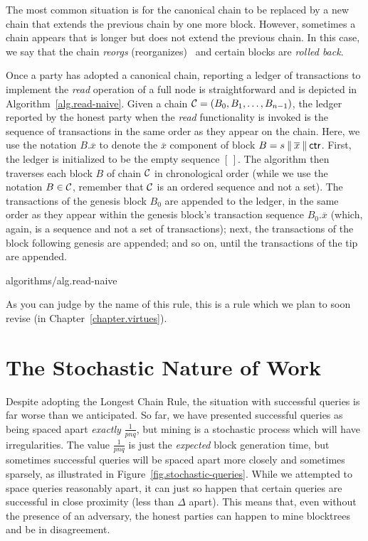 The most common situation is for the canonical chain to be replaced by a new chain
that extends the previous chain by one more block. However, sometimes a chain appears
that is longer but does not extend the previous chain. In this case, we say that
the chain \emph{reorgs} (reorganizes)~ and certain blocks are \emph{rolled
back}.

Once a party has adopted a canonical chain, reporting a ledger of transactions
to implement the \emph{read} operation of a full node is straightforward and
is depicted in Algorithm~\ref{alg.read-naive}. Given a chain
$\mathcal{C} = (B_0, B_1, \ldots, B_{n-1})$, the ledger reported by the honest
party when the \emph{read} functionality is invoked is the sequence of
transactions in the same order as they appear on the chain.
Here, we use the notation $B.\overline{x}$ to denote the $\overline{x}$ component
of block $B = s \mathbin{\|} \overline{x} \mathbin{\|} \mathsf{ctr}$.
First, the ledger is initialized to be the empty sequence $[\,]$. The algorithm
then traverses each block $B$ of chain $\mathcal{C}$ in chronological order (while we
use the notation $B \in \mathcal{C}$, remember that $\mathcal{C}$ is an ordered sequence
and not a set). The transactions of the genesis block $B_0$ are appended to the ledger, in the same
order as they appear within the genesis block's transaction sequence $B_0.\overline{x}$
(which, again, is a sequence and not a set of transactions);
next, the transactions of the block following genesis are appended; and so on, until
the transactions of the tip are appended.

{algorithms/alg.read-naive}

As you can judge by the name of this rule, this is a rule which we plan to
soon revise (in Chapter~\ref{chapter.virtues}).

\section{The Stochastic Nature of Work}

Despite adopting the Longest Chain Rule, the situation with successful queries
is far worse than we anticipated.
So far, we have presented successful queries as being
spaced apart \emph{exactly} $\frac{1}{pnq}$, but mining is a stochastic process which will have
irregularities. The value $\frac{1}{pnq}$ is just the \emph{expected} block generation time, but
sometimes successful queries will be spaced apart more closely and sometimes sparsely, as illustrated
in Figure~\ref{fig.stochastic-queries}. While we attempted to space queries reasonably apart, it can
just so happen that certain queries are successful in close proximity (less than $\Delta$ apart).
This means that, even without the presence of an adversary, the honest parties can happen to
mine blocktrees and be in disagreement.

